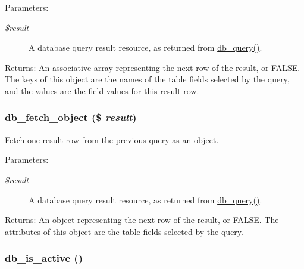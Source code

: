 \begin{Desc}
\item[Parameters:]
\begin{description}
\item[{\em \$result}]A database query result resource, as returned from \hyperlink{database_8mysql-common_8inc_9e096321b86945d128746ac7bedce8f3}{db\_\-query()}. \end{description}
\end{Desc}
\begin{Desc}
\item[Returns:]An associative array representing the next row of the result, or FALSE. The keys of this object are the names of the table fields selected by the query, and the values are the field values for this result row. \end{Desc}
\hypertarget{group__database_g5faaeba7105d28828db453b4fd3c75d4}{
\subsubsection[{db\_\-fetch\_\-object}]{\setlength{\rightskip}{0pt plus 5cm}db\_\-fetch\_\-object (\$ {\em result})}}
\label{group__database_g5faaeba7105d28828db453b4fd3c75d4}


Fetch one result row from the previous query as an object.

\begin{Desc}
\item[Parameters:]
\begin{description}
\item[{\em \$result}]A database query result resource, as returned from \hyperlink{database_8mysql-common_8inc_9e096321b86945d128746ac7bedce8f3}{db\_\-query()}. \end{description}
\end{Desc}
\begin{Desc}
\item[Returns:]An object representing the next row of the result, or FALSE. The attributes of this object are the table fields selected by the query. \end{Desc}
\hypertarget{group__database_g19eaaae8681bb72e7476ef0aa0a5d01f}{
\subsubsection[{db\_\-is\_\-active}]{\setlength{\rightskip}{0pt plus 5cm}db\_\-is\_\-active ()}}
\label{group__database_g19eaaae8681bb72e7476ef0aa0a5d01f}


